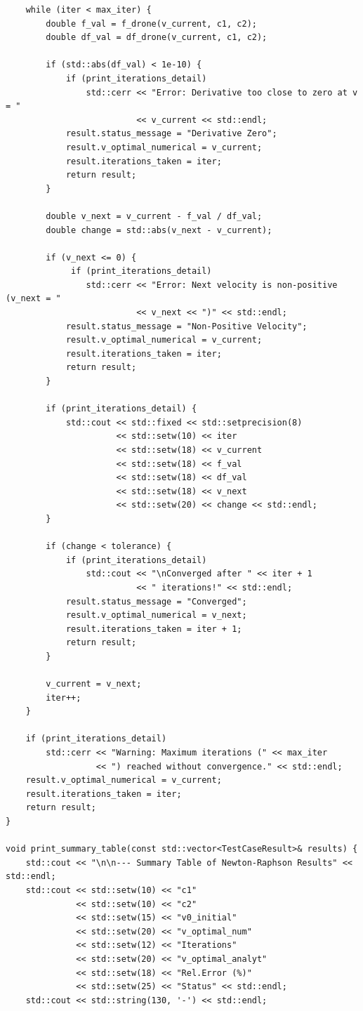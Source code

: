 \documentclass[conference]{IEEEtran}
\begin{document}
\begin{verbatim}
    while (iter < max_iter) {
        double f_val = f_drone(v_current, c1, c2);
        double df_val = df_drone(v_current, c1, c2);

        if (std::abs(df_val) < 1e-10) { 
            if (print_iterations_detail) 
                std::cerr << "Error: Derivative too close to zero at v = " 
                          << v_current << std::endl;
            result.status_message = "Derivative Zero";
            result.v_optimal_numerical = v_current;
            result.iterations_taken = iter;
            return result;
        }

        double v_next = v_current - f_val / df_val;
        double change = std::abs(v_next - v_current);

        if (v_next <= 0) { 
             if (print_iterations_detail) 
                std::cerr << "Error: Next velocity is non-positive (v_next = " 
                          << v_next << ")" << std::endl;
            result.status_message = "Non-Positive Velocity";
            result.v_optimal_numerical = v_current; 
            result.iterations_taken = iter;
            return result;
        }

        if (print_iterations_detail) {
            std::cout << std::fixed << std::setprecision(8)
                      << std::setw(10) << iter
                      << std::setw(18) << v_current
                      << std::setw(18) << f_val
                      << std::setw(18) << df_val
                      << std::setw(18) << v_next
                      << std::setw(20) << change << std::endl;
        }

        if (change < tolerance) {
            if (print_iterations_detail) 
                std::cout << "\nConverged after " << iter + 1 
                          << " iterations!" << std::endl;
            result.status_message = "Converged";
            result.v_optimal_numerical = v_next;
            result.iterations_taken = iter + 1;
            return result;
        }

        v_current = v_next;
        iter++;
    }

    if (print_iterations_detail) 
        std::cerr << "Warning: Maximum iterations (" << max_iter 
                  << ") reached without convergence." << std::endl;
    result.v_optimal_numerical = v_current; 
    result.iterations_taken = iter;
    return result;
}

void print_summary_table(const std::vector<TestCaseResult>& results) {
    std::cout << "\n\n--- Summary Table of Newton-Raphson Results" << std::endl;
    std::cout << std::setw(10) << "c1"
              << std::setw(10) << "c2"
              << std::setw(15) << "v0_initial"
              << std::setw(20) << "v_optimal_num"
              << std::setw(12) << "Iterations"
              << std::setw(20) << "v_optimal_analyt"
              << std::setw(18) << "Rel.Error (%)"
              << std::setw(25) << "Status" << std::endl;
    std::cout << std::string(130, '-') << std::endl;


\end{verbatim}
\end{document}
